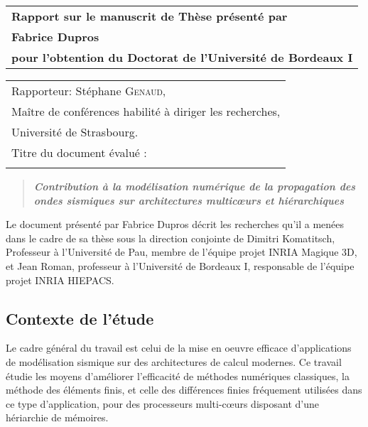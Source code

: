 \documentclass[a4paper,12pt]{article}
\begin{document}
\begin{flushleft}
\begin{tabular}[t]{l}
\Large\textsf{\textbf{Rapport sur le manuscrit de Thèse présenté par}}\\[4mm]
\Large\textsf{\textbf{Fabrice Dupros}}\\[4mm]
\large\textsf{\textbf{pour l'obtention du Doctorat de l'Université de Bordeaux I}}\\
\end{tabular}%

\vspace{4mm}

\noindent%
\begin{tabular}[t]{l}
Rapporteur: Stéphane \textsc{Genaud},\\
Maître de conférences habilité à diriger les recherches,\\
Université de Strasbourg.\\[5mm]
Titre du document évalué :\\\\[3mm]
\end{tabular}%

\begin{quote}
\Large \textit{\textsf{\textbf{
Contribution à la modélisation numérique de la propagation des ondes sismiques sur architectures multic{\oe}urs et hiérarchiques}}}
\end{quote}

\end{flushleft}

\vspace{3mm}

Le document présenté par Fabrice Dupros décrit les recherches qu'il a menées dans
le cadre de sa thèse sous la direction conjointe de Dimitri Komatitsch, Professeur à l'Université 
de Pau, membre de l'équipe projet INRIA Magique 3D, et Jean Roman, professeur à l'Université de
Bordeaux I, responsable de l'équipe projet INRIA HIEPACS.



\subsection*{Contexte de l'étude}
Le cadre général du travail est celui de la mise en oeuvre efficace 
d'applications de modélisation sismique sur des architectures de 
calcul modernes. Ce travail étudie les moyens d'améliorer l'efficacité
de méthodes numériques classiques, la méthode des éléments finis, et celle
des différences finies fréquement utilisées dans ce type d'application,
pour des processeurs multi-c{\oe}urs disposant d'une hériarchie de mémoires.
\end{document}
